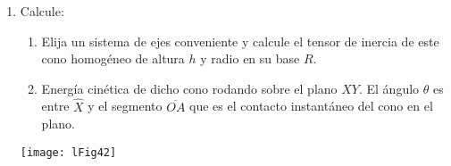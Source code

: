 \documentclass[11pt, spanish, a4paper, twoside]{article}
\begin{document}
\begin{enumerate}
\item 
\begin{minipage}[t][3.5cm]{0.5\textwidth}
Calcule:
	\begin{enumerate}
		\item Elija un sistema de ejes conveniente y calcule el tensor de inercia de este cono homogéneo de altura \(h\) y radio en su base \(R\).
		\item Energía cinética de dicho cono rodando sobre el plano \(X Y\).
		El ángulo \(\theta\) es entre \(\hat{X}\) y el segmento \(\overline{O A}\) que es el contacto instantáneo del cono en el plano.
	\end{enumerate}
\end{minipage}
\begin{minipage}[c][1cm][t]{0.45\textwidth}
	\texttt{[image: lFig42]}
\end{minipage}




\end{enumerate}
\end{document}
